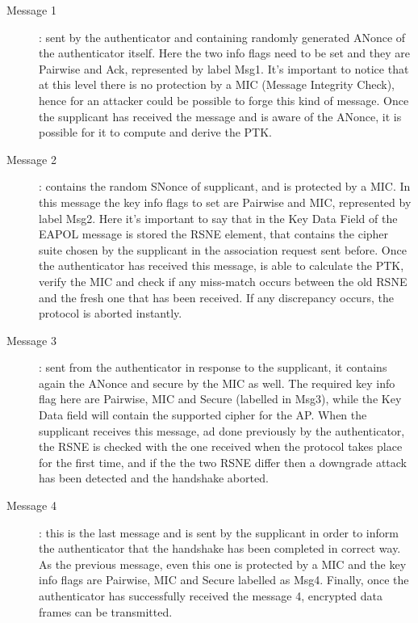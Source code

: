 \begin{description}
\begin{description}
  \item[Message 1]: sent by the authenticator and containing randomly generated ANonce of the authenticator itself. Here the two info flags need to be set and they are Pairwise and Ack, represented by label Msg1. It's important
  to notice that at this level there is no protection by a MIC (Message Integrity Check), hence for an attacker could be possible to forge this kind of message.
  Once the supplicant has received the message and is aware of the ANonce, it is possible for it to compute and derive the PTK.

  \item[Message 2]: contains the random SNonce of supplicant, and is protected by a MIC. In this message the key info flags to set are Pairwise and MIC, represented by label Msg2. Here it's important to say that in the Key Data Field of the EAPOL message is stored
  the RSNE element, that contains the cipher suite chosen by the supplicant in the association request sent before. Once the authenticator has received this message, is able to calculate the PTK, verify the MIC and check if any miss-match occurs 
  between the old RSNE and the fresh one that has been received. If any discrepancy occurs, the protocol is aborted instantly.

  \item[Message 3]: sent from the authenticator in response to the supplicant, it contains again the ANonce and secure by the MIC as well. The required key info flag here are Pairwise, MIC and Secure (labelled in Msg3), while the Key Data field will contain the supported 
  cipher for the AP. When the supplicant receives this message, ad done previously by the authenticator, the RSNE is checked with the one received when the protocol takes place for the first time, and if the the two RSNE
  differ then a downgrade attack has been detected and the handshake aborted.

  \item[Message 4]: this is the last message and is sent by the supplicant in order to inform the authenticator that the handshake has been completed in correct way. As the previous message, even this one is protected
  by a MIC and the key info flags are Pairwise, MIC and Secure labelled as Msg4. Finally, once the authenticator has successfully received the message 4, encrypted data frames can be transmitted.
\end{description}


\end{description}
